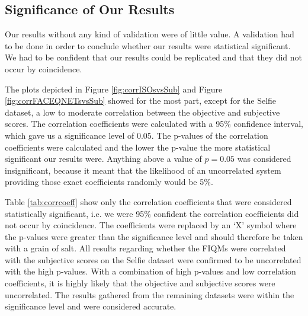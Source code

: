 \subsection{Significance of Our Results}
Our results without any kind of validation were of little value. A validation had to be done in order to conclude whether our results were statistical significant. We had to be confident that our results could be replicated and that they did not occur by coincidence. 

The plots depicted in Figure \ref{fig:corrISOsvsSub} and Figure \ref{fig:corrFACEQNETsvsSub} showed for the most part, except for the Selfie dataset, a low to moderate correlation between the objective and subjective scores. The correlation coefficients were calculated with a 95\% confidence interval, which gave us a significance level of 0.05. The p-values of the correlation coefficients were calculated and the lower the p-value the more statistical significant our results were. Anything above a value of $p = 0.05$ was considered insignificant, because it meant that the likelihood of an uncorrelated system providing those exact coefficients randomly would be 5\%. 

Table \ref{tab:corrcoeff} show only the correlation coefficients that were considered statistically significant, i.e. we were 95\% confident the correlation coefficients did not occur by coincidence. The coefficients were replaced by an `X' symbol where the p-values were greater than the significance level and should therefore be taken with a grain of salt. All results regarding whether the FIQMs were correlated with the subjective scores on the Selfie dataset were confirmed to be uncorrelated with the high p-values. With a combination of high p-values and low correlation coefficients, it is highly likely that the objective and subjective scores were uncorrelated. The results gathered from the remaining datasets were within the significance level and were considered accurate.  


